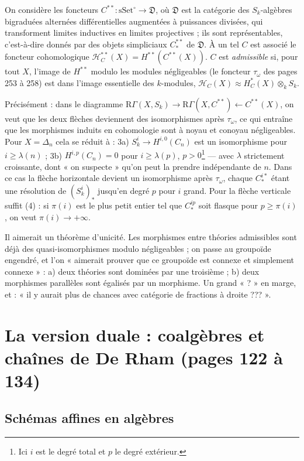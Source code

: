 \documentclass[11pt,a4paper]{article}
\begin{document}
On considère les foncteurs $C^{**} : \mathrm{sSet}^\circ \to \mathfrak{D}$, où
$\mathfrak{D}$ est la catégorie des $S_k$-algèbres bigraduées alternées
différentielles augmentées à puissances divisées, qui transforment limites
inductives en limites projectives ; ils sont représentables, c'est-à-dire donnés
par des objets simpliciaux $C^{**}_*$ de $\mathfrak{D}$. À un tel $C$ est
associé le foncteur cohomologique $\mathcal{H}^{**}_C(X) = H^{**}(C^{**}(X))$.
$C$ est \emph{admissible} si, pour tout $X$, l'image de $H^{**}$ modulo les
modules négligeables (le foncteur $\tau_\omega$ des pages 253 à 258) est dans
l'image essentielle des $k$-modules, $\mathcal{H}_C(X) \approx H^*_C(X)
\otimes_k S_k$.

Précisément : dans le diagramme $\mathrm{R}\Gamma(X, S_k) \to \mathrm{R}\Gamma(X,
C^{**}) \leftarrow C^{**}(X)$, on veut que les deux flèches deviennent des
isomorphismes après $\tau_\omega$, ce qui entraîne que les morphismes induits
en cohomologie sont à noyau et conoyau négligeables. Pour $X = \Delta_n$ cela
se réduit à :
3a) $S^i_k \to H^{i,0}(C_n)$ est un isomorphisme pour $i \geq \lambda(n)$ ;
3b) $H^{i,p}(C_n) = 0$ pour $i \geq \lambda(p)$, $p > 0$\footnote{Ici $i$ est le
degré total et $p$ le degré extérieur.} — avec $\lambda$ strictement
croissante, dont « on suspecte » qu'on peut la prendre indépendante de $n$.
Dans ce cas la flèche horizontale devient un isomorphisme après $\tau_\omega$,
chaque $C^{i*}_*$ étant une résolution de $(S^i_k)_*$ jusqu'en degré $p$ pour
$i$ grand. Pour la flèche verticale suffit (4) : si $\pi(i)$ est le plus petit
entier tel que $C^{ip}_*$ soit flasque pour $p \geq \pi(i)$, on veut $\pi(i) \to
+\infty$.

Il aimerait un théorème d'unicité. Les morphismes entre théories admissibles
sont déjà des quasi-isomorphismes modulo négligeables ; on passe au groupoïde
engendré, et l'on « aimerait prouver que ce groupoïde est connexe et simplement
connexe » : a) deux théories sont dominées par une troisième ; b) deux
morphismes parallèles sont égalisés par un morphisme. Un grand « ? » en marge,
et : « il y aurait plus de chances avec catégorie de fractions à droite ??? ».

\section*{La version duale : coalgèbres et chaînes de De Rham (pages 122 à 134)}

\subsection*{Schémas affines en algèbres}
\end{document}
